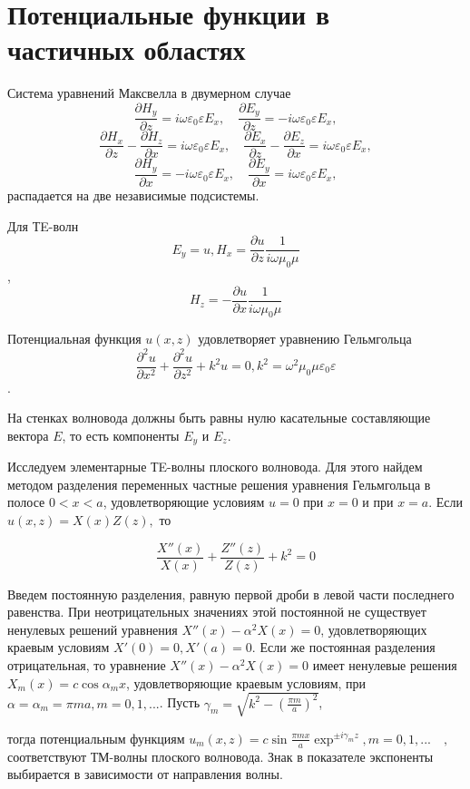 \chapter{Потенциальные функции в частичных областях}

Система уравнений Максвелла в двумерном случае
\[  \frac{\partial H_y}{\partial z} = i\omega\varepsilon_0\varepsilon E_x , \quad 
\frac{\partial E_y}{\partial z} = -i\omega\varepsilon_0\varepsilon E_x
 ,\]
 \[  \frac{\partial H_x}{\partial z} -
  \frac{\partial H_z}{\partial x} =
 i\omega\varepsilon_0\varepsilon E_x , \quad 
\frac{\partial E_x}{\partial z} -
\frac{\partial E_z}{\partial x}=
i\omega\varepsilon_0\varepsilon E_x
, \]
\[  \frac{\partial H_y}{\partial x} = -i\omega\varepsilon_0\varepsilon E_x , \quad 
\frac{\partial E_y}{\partial x} = i\omega\varepsilon_0\varepsilon E_x
 ,\]
распадается на две независимые подсистемы.

Для ТE-волн
$$
	E_y=u, H_x= \frac{\partial u}{\partial z} \frac{1}{i\omega\mu_0\mu}
$$,
$$
	H_z=- \frac{\partial u}{\partial x} \frac{1}{i\omega\mu_0\mu}
$$

Потенциальная функция $u(x,z)$ удовлетворяет уравнению Гельмгольца 
$$ \frac{\partial^2 u}{\partial x^2} +
\frac{\partial^2 u}{\partial z^2} +
k^2u =0, k^2=\omega^2\mu_0\mu\varepsilon_0\varepsilon
$$.

На стенках волновода должны быть равны нулю касательные составляющие вектора $E$, то есть компоненты $E_y$ и $E_z$.

Исследуем элементарные ТE-волны плоского волновода. Для этого найдем методом разделения переменных частные решения уравнения Гельмгольца в полосе $0<x<a$, удовлетворяющие условиям $u=0$ при $x=0$ и при $x=a$. Если $u(x,z)= X(x)Z(z), $ то

$$
	\frac{X''(x)}{X(x)}+ \frac{Z''(z)}{Z(z)}+k^2=0
$$

Введем постоянную разделения, равную первой дроби в левой части последнего равенства. При неотрицательных значениях этой постоянной не существует ненулевых решений уравнения $ X''(x)- \alpha^2 X(x)=0$, удовлетворяющих краевым условиям $X'(0)=0, X'(a)=0 $. Если же постоянная разделения отрицательная, то уравнение $ X''(x)- \alpha^2 X(x)=0$ имеет ненулевые решения $X_m(x)= c\cos\alpha_mx$, удовлетворяющие краевым условиям, при $\alpha=\alpha_m=\pi m a, m=0,1,...$. Пусть 
$\gamma_m=\sqrt{k^2-\left(\frac{\pi m}{a}\right)^2}$,

тогда потенциальным функциям 
$ u_m(x,z)=c\sin\frac{\pi m x}{a}\exp^{\pm i\gamma_m z}, m=0,1,...\quad , $
соответствуют ТМ-волны плоского волновода. Знак в показателе экспоненты выбирается в зависимости от направления волны.

